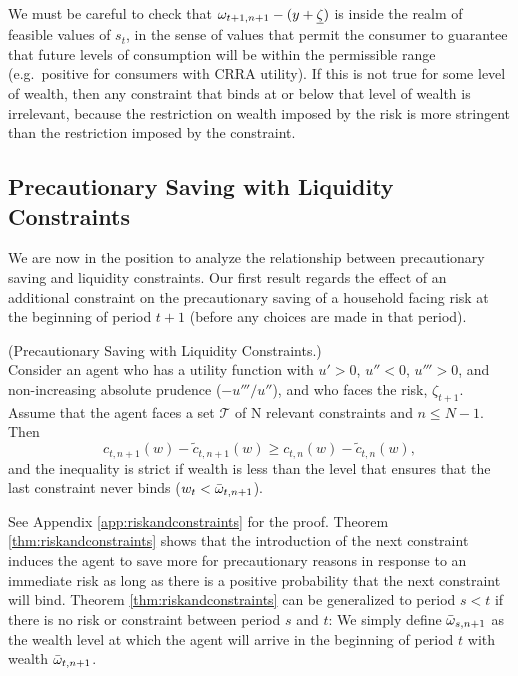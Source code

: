 We must be careful to check that $\omega_{t+1,n+1}-({y}+\underline{\zeta})$ is inside the realm of feasible values of $s_{t}$, in the sense of values that permit the consumer to guarantee that future levels of consumption will be within the permissible range (e.g.\ positive for consumers with CRRA utility). If this is not true for some level of wealth, then any constraint that binds at or below that level of wealth is irrelevant, because the restriction on wealth imposed by the risk is more stringent than the restriction imposed by the constraint.


\subsection{Precautionary Saving with Liquidity Constraints}

We are now in the position to analyze the relationship between precautionary saving and liquidity constraints. Our first result regards the effect of an additional constraint on the precautionary saving of a household facing risk at the beginning of period $t+1$ (before any choices are made in that period).

\begin{theorem}\label{thm:riskandconstraints} (Precautionary Saving with Liquidity Constraints.) \\
	Consider an agent who has a utility function with $u'> 0$, $u''< 0$, $u''' > 0$, and non-increasing absolute prudence ($-u'''/u''$), and who faces the risk, $\zeta_{t+1}$. Assume that the agent faces a set $\mathcal{T}$ of N relevant constraints and $n \leq N-1$. Then
	\begin{equation}
	c_{t,n+1}(w) - \tilde{c}_{t,n+1}(w) \geq c_{t,n}(w)-\tilde{c}_{t,n}(w), \label{eq:ineq}
	\end{equation}
	and the inequality is strict if wealth is less than the level that ensures that the last constraint never binds ($w_t < \bar{\omega}_{t,n+1}$).
\end{theorem}

See Appendix \ref{app:riskandconstraints} for the proof. Theorem \ref{thm:riskandconstraints} shows that the introduction of the next constraint induces the agent to save more for precautionary reasons in response to an immediate risk as long as there is a positive probability that the next constraint will bind. Theorem \ref{thm:riskandconstraints} can be generalized to period $s < t$ if there is no risk or constraint between period $s$ and $t$: We simply define $\bar{\omega}_{s,n+1}$ as the wealth level at which the agent will arrive in the beginning of period $t$ with wealth $\bar{\omega}_{t,n+1}$.

